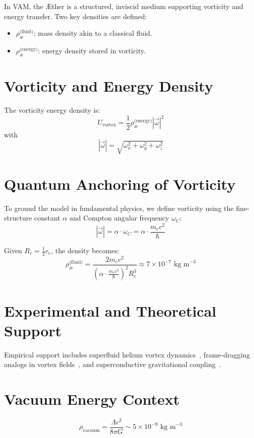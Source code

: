 In VAM, the Æther is a structured, inviscid medium supporting vorticity and energy transfer. Two key densities are defined:
\begin{itemize}
    \item $\rho_{\text{\ae}}^{\text{(fluid)}}$: mass density akin to a classical fluid.
    \item $\rho_{\text{\ae}}^{\text{(energy)}}$: energy density stored in vorticity.
\end{itemize}

\section{Vorticity and Energy Density}

The vorticity energy density is:
\[
U_{\text{vortex}} = \frac{1}{2} \rho_{\text{\ae}}^{\text{(energy)}} |\vec{\omega}|^2
\]
with
\[
|\vec{\omega}| = \sqrt{\omega_x^2 + \omega_y^2 + \omega_z^2}
\]

\section{Quantum Anchoring of Vorticity}

To ground the model in fundamental physics, we define vorticity using the fine-structure constant $\alpha$ and Compton angular frequency $\omega_C$:
\[
|\vec{\omega}| = \alpha \cdot \omega_C = \alpha \cdot \frac{m_e c^2}{\hbar}
\]

Given $R_c = \frac{1}{2} r_e$, the density becomes:
\[
\rho_{\text{\ae}}^{\text{(fluid)}} = \frac{2 m_e c^2}{\left(\alpha \cdot \frac{m_e c^2}{\hbar}\right)^2 R_c^3} \approx 7 \times 10^{-7} \text{ kg m}^{-3}
\]

\section{Experimental and Theoretical Support}

Empirical support includes superfluid helium vortex dynamics~\cite{jackson2021}, frame-dragging analogs in vortex fields~\cite{paris2015}, and superconductive gravitational coupling~\cite{santiago2011}.

\section{Vacuum Energy Context}

\[
\rho_{\text{vacuum}} = \frac{\Lambda c^2}{8 \pi G} \sim 5 \times 10^{-9} \text{ kg m}^{-3}
\]

